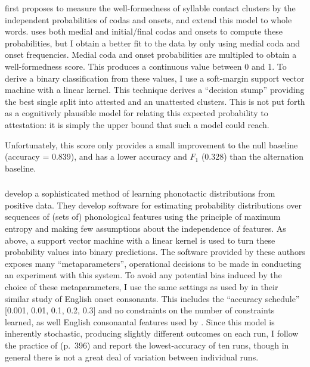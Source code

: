 \citet{Pierrehumbert1994} first proposes to measure the well-formedness of syllable contact clusters by the independent probabilities of codas and onsets, and \citet{Coleman1997} extend this model to whole words. \citet{Pierrehumbert1994} uses both medial and initial/final codas and onsets to compute these probabilities, but I obtain a better fit to the data by only using medial coda and onset frequencies. Medial coda and onset probabilities are multipled to obtain a well-formedness score. This produces a continuous value between 0 and 1. To derive a binary classification from these values, I use a soft-margin support vector machine \citep{Cortes1995} with a linear kernel. This technique derives a ``decision stump'' providing the best single split into attested and an unattested clusters. This is not put forth as a cognitively plausible model for relating this expected probability to attestation: it is simply the upper bound that such a model could reach. 

Unfortunately, this score only provides a small improvement to the null baseline
 (accuracy = 0.839), and has a lower accuracy and $F_1$ (0.328) than the alternation baseline. 

\subsubsection{\citet{Hayes2008a}}

\citeauthor{Hayes2008a} develop a sophisticated method of learning phonotactic distributions from positive data. They develop software for estimating probability distributions over sequences of (sets of) phonological features using the principle of maximum entropy and making few assumptions about the independence of features. As above, a support vector machine with a linear kernel is used to turn these probability values into binary predictions. The software provided by these authors exposes many ``metaparameters'', operational decisions to be made in conducting an experiment with this system. To avoid any potential bias induced by the choice of these metaparameters, I use the same settings as used by \citet{Hayes2008a} in their similar study of English onset consonants. This includes the ``accuracy schedule'' [0.001, 0.01, 0.1, 0.2, 0.3] and no constraints on the number of constraints learned, as well English consonantal features used by \citeauthor{Hayes2008a}. Since this model is inherently stochastic, producing slightly different outcomes on each run, I follow the practice of \citeauthor{Hayes2008a} (p.~396) and report the lowest-accuracy of ten runs, though in general there is not a great deal of variation between individual runs.  

